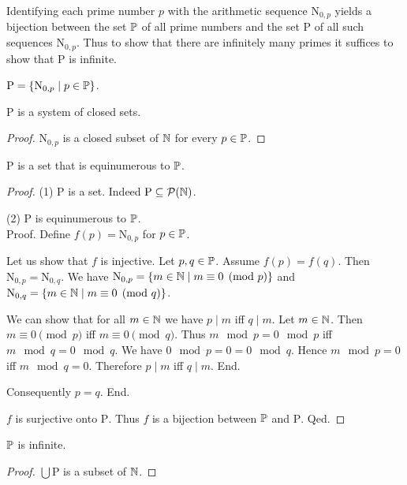 \documentclass{article}
\newcommand{\N}{\mathrm{N}}
\newcommand{\Ps}{\mathrm{P}}
\begin{document}
  Identifying each prime number $p$ with the arithmetic sequence $\N_{0, p}$
  yields a bijection between the set $\mathbb{P}$ of all prime numbers and the set
  $\Ps$ of all such sequences $\N_{0, p}$.
  Thus to show that there are infinitely many primes it suffices to show that
  $\Ps$ is infinite.

  \begin{forthel}
    \begin{definition}
      $\Ps = \{ \N_{0, p} \mid p \in \Prime \}$.
    \end{definition}

    \begin{lemma}
      $\Ps$ is a system of closed sets.
    \end{lemma}
    \begin{proof}
      $\N_{0, p}$ is a closed subset of $\mathbb{N}$ for every $p \in \mathbb{P}$.
    \end{proof}

    \begin{lemma}
      $\Ps$ is a set that is equinumerous to $\mathbb{P}$.
    \end{lemma}
    \begin{proof}
      (1) $\Ps$ is a set.
      Indeed $\Ps \subseteq \pow(\Nat)$.

      (2) $\Ps$ is equinumerous to $\mathbb{P}$. \\
      Proof.
        Define $f(p) = \N_{0,p}$ for $p \in \mathbb{P}$.

        Let us show that $f$ is injective.
          Let $p, q \in \mathbb{P}$.
          Assume $f(p) = f(q)$.
          Then $\N_{0, p} = \N_{0, q}$.
          We have $\N_{0, p} = \{ m \in \Nat \mid m \equiv 0 \pmod{p} \}$ and
          $\N_{0, q} = \{ m \in \Nat \mid m \equiv 0 \pmod{q} \}$.

          We can show that for all $m \in \mathbb{N}$ we have $p \mid m$ iff $q \mid m$.
            Let $m \in \mathbb{N}$.
            Then $m \equiv 0 \pmod{p}$ iff $m \equiv 0 \pmod{q}$.
            Thus $m \mod p = 0 \mod p$ iff $m \mod q = 0 \mod q$.
            We have $0 \mod p = 0 = 0 \mod q$.
            Hence $m \mod p = 0$ iff $m \mod q = 0$.
            Therefore $p \mid m$ iff $q \mid m$.
          End.

          Consequently $p = q$.
        End.

        $f$ is surjective onto $\Ps$.
        Thus $f$ is a bijection between $\mathbb{P}$ and $\Ps$.
      Qed.
    \end{proof}

    \begin{theorem}[title=Furstenberg]
      $\mathbb{P}$ is infinite.
    \end{theorem}
    \begin{proof}
      $\bigcup \Ps$ is a subset of $\mathbb{N}$.


\end{proof}
\end{forthel}
\end{document}
